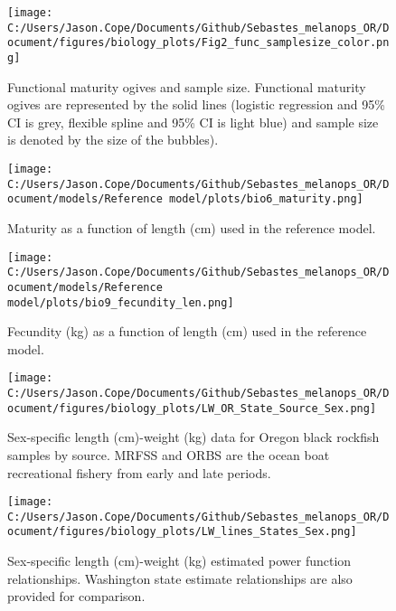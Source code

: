 \documentclass[11pt,
  letterpaper,
]{article}
\begin{document}
\newpage

\begin{figure}
{\centering
\texttt{[image: C:/Users/Jason.Cope/Documents/Github/Sebastes\_melanops\_OR/Document/figures/biology\_plots/Fig2\_func\_samplesize\_color.png]}
}
\caption{Functional maturity ogives and sample size. Functional maturity ogives are represented by the solid lines (logistic regression and 95\% CI is grey, flexible spline and 95\% CI is light blue) and sample size is denoted by the size of the bubbles).\label{fig:fxn-spline-mat-color}}
\end{figure}

\newpage

\begin{figure}
{\centering
\texttt{[image: C:/Users/Jason.Cope/Documents/Github/Sebastes\_melanops\_OR/Document/models/Reference model/plots/bio6\_maturity.png]}
}
\caption{Maturity as a function of length (cm) used in the reference model.\label{fig:maturity}}
\end{figure}

\newpage

\begin{figure}
{\centering
\texttt{[image: C:/Users/Jason.Cope/Documents/Github/Sebastes\_melanops\_OR/Document/models/Reference model/plots/bio9\_fecundity\_len.png]}
}
\caption{Fecundity (kg) as a function of length (cm) used in the reference model.\label{fig:fecundity}}
\end{figure}

\newpage

\begin{figure}
{\centering
\texttt{[image: C:/Users/Jason.Cope/Documents/Github/Sebastes\_melanops\_OR/Document/figures/biology\_plots/LW\_OR\_State\_Source\_Sex.png]}
}
\caption{Sex-specific length (cm)-weight (kg) data for Oregon black rockfish samples by source. MRFSS and ORBS are the ocean boat recreational fishery from early and late periods.\label{fig:len-weight-data}}
\end{figure}

\newpage

\begin{figure}
{\centering
\texttt{[image: C:/Users/Jason.Cope/Documents/Github/Sebastes\_melanops\_OR/Document/figures/biology\_plots/LW\_lines\_States\_Sex.png]}
}
\caption{Sex-specific length (cm)-weight (kg) estimated power function relationships. Washington state estimate relationships are also provided for comparison.\label{fig:len-weight-or-wa}}
\end{figure}
\end{document}
